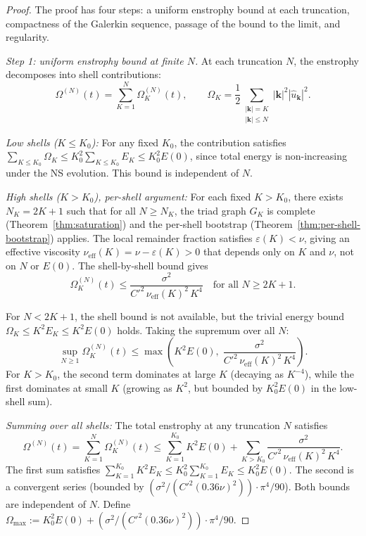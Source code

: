 \documentclass[11pt,a4paper]{article}
\theoremstyle{remark}
\begin{document}
\begin{proof}
The proof has four steps: a uniform enstrophy bound at each truncation, compactness of the Galerkin sequence, passage of the bound to the limit, and regularity.

\medskip
\emph{Step 1: uniform enstrophy bound at finite $N$.}
At each truncation $N$, the enstrophy decomposes into shell contributions:
\[
  \Omega^{(N)}(t) = \sum_{K=1}^{N} \Omega_K^{(N)}(t), \qquad \Omega_K = \frac{1}{2}\sum_{\substack{|\mathbf{k}|=K \\ |\mathbf{k}| \leq N}} |\mathbf{k}|^2 |\hat{u}_{\mathbf{k}}|^2.
\]

\emph{Low shells ($K \leq K_0$):}  For any fixed $K_0$, the contribution satisfies $\sum_{K \leq K_0} \Omega_K \leq K_0^2 \sum_{K \leq K_0} E_K \leq K_0^2 E(0)$, since total energy is non-increasing under the NS evolution.  This bound is independent of $N$.

\emph{High shells ($K > K_0$), per-shell argument:}  For each fixed $K > K_0$, there exists $N_K = 2K + 1$ such that for all $N \geq N_K$, the triad graph $G_K$ is complete (Theorem~\ref{thm:saturation}) and the per-shell bootstrap (Theorem~\ref{thm:per-shell-bootstrap}) applies.  The local remainder fraction satisfies $\varepsilon(K) < \nu$, giving an effective viscosity $\nu_{\mathrm{eff}}(K) = \nu - \varepsilon(K) > 0$ that depends only on $K$ and $\nu$, not on $N$ or $E(0)$.  The shell-by-shell bound gives
\[
  \Omega_K^{(N)}(t) \leq \frac{\sigma^2}{C'^2\, \nu_{\mathrm{eff}}(K)^2\, K^4} \quad \text{for all } N \geq 2K + 1.
\]

For $N < 2K + 1$, the shell bound is not available, but the trivial energy bound $\Omega_K \leq K^2 E_K \leq K^2 E(0)$ holds.  Taking the supremum over all $N$:
\[
  \sup_{N \geq 1} \Omega_K^{(N)}(t) \leq \max\!\left(K^2 E(0),\; \frac{\sigma^2}{C'^2\, \nu_{\mathrm{eff}}(K)^2\, K^4}\right).
\]
For $K > K_0$, the second term dominates at large $K$ (decaying as $K^{-4}$), while the first dominates at small $K$ (growing as $K^2$, but bounded by $K_0^2 E(0)$ in the low-shell sum).

\emph{Summing over all shells:}  The total enstrophy at any truncation $N$ satisfies
\[
  \Omega^{(N)}(t) = \sum_{K=1}^{N} \Omega_K^{(N)}(t) \leq \sum_{K=1}^{K_0} K^2 E(0) + \sum_{K > K_0} \frac{\sigma^2}{C'^2\, \nu_{\mathrm{eff}}(K)^2\, K^4}.
\]
The first sum satisfies $\sum_{K=1}^{K_0} K^2 E_K \leq K_0^2 \sum_{K=1}^{K_0} E_K \leq K_0^2 E(0)$.  The second is a convergent series (bounded by $(\sigma^2/(C'^2 (0.36\nu)^2)) \cdot \pi^4/90$).  Both bounds are independent of $N$.  Define $\Omega_{\max} := K_0^2 E(0) + (\sigma^2/(C'^2 (0.36\nu)^2)) \cdot \pi^4/90$.


\end{proof}
\end{document}
